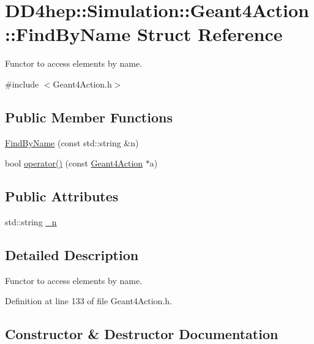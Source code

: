 \hypertarget{struct_d_d4hep_1_1_simulation_1_1_geant4_action_1_1_find_by_name}{}\section{D\+D4hep\+:\+:Simulation\+:\+:Geant4\+Action\+:\+:Find\+By\+Name Struct Reference}
\label{struct_d_d4hep_1_1_simulation_1_1_geant4_action_1_1_find_by_name}


Functor to access elements by name.  




{\ttfamily \#include $<$Geant4\+Action.\+h$>$}

\subsection*{Public Member Functions}
\begin{DoxyCompactItemize}
\item 
\hyperlink{struct_d_d4hep_1_1_simulation_1_1_geant4_action_1_1_find_by_name_a731d979b2f54aaeb1f99d6c3723681d0}{Find\+By\+Name} (const std\+::string \&n)
\item 
bool \hyperlink{struct_d_d4hep_1_1_simulation_1_1_geant4_action_1_1_find_by_name_add22afec2f12ebc3ead57df3694de5e5}{operator()} (const \hyperlink{class_d_d4hep_1_1_simulation_1_1_geant4_action}{Geant4\+Action} $\ast$a)
\end{DoxyCompactItemize}
\subsection*{Public Attributes}
\begin{DoxyCompactItemize}
\item 
std\+::string \hyperlink{struct_d_d4hep_1_1_simulation_1_1_geant4_action_1_1_find_by_name_ab2021d91a8c4487ef27bce6cb6d69966}{\+\_\+n}
\end{DoxyCompactItemize}


\subsection{Detailed Description}
Functor to access elements by name. 

Definition at line 133 of file Geant4\+Action.\+h.



\subsection{Constructor \& Destructor Documentation}
\hypertarget{struct_d_d4hep_1_1_simulation_1_1_geant4_action_1_1_find_by_name_a731d979b2f54aaeb1f99d6c3723681d0}{}\label{struct_d_d4hep_1_1_simulation_1_1_geant4_action_1_1_find_by_name_a731d979b2f54aaeb1f99d6c3723681d0} 
